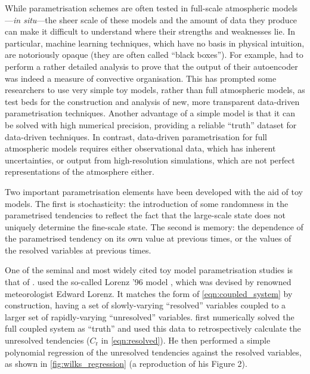 \documentclass[titlepage]{article}
\begin{document}
While parametrisation schemes are often tested in full-scale atmospheric
models---\emph{in situ}---the sheer scale of these models and the amount of
data they produce can make it difficult to understand where their strengths and
weaknesses lie. In particular, machine learning techniques, which have no basis
in physical intuition, are notoriously opaque (they are often called ``black
boxes''). For example, \textcite{shamekh2022} had to perform a rather detailed
analysis to prove that the output of their autoencoder was indeed a measure of
convective organisation. This has prompted some researchers to use very simple
toy models, rather than full atmospheric models, as test beds for the
construction and analysis of new, more transparent data-driven parametrisation
techniques. Another advantage of a simple model is that it can be solved with
high numerical precision, providing a reliable ``truth'' dataset for
data-driven techniques. In contrast, data-driven parametrisation for full
atmospheric models requires either observational data, which has inherent
uncertainties, or output from high-resolution simulations, which are not
perfect representations of the atmosphere either.

Two important parametrisation elements have been developed with the aid of toy
models. The first is stochasticity: the introduction of some randomness in the
parametrised tendencies to reflect the fact that the large-scale state does
not uniquely determine the fine-scale state. The second is memory: the dependence
of the parametrised tendency on its own value at previous times, or the values
of the resolved variables at previous times.

One of the seminal and most widely cited toy model parametrisation studies is
that of \textcite{wilks2005}. \citeauthor{wilks2005} used the so-called Lorenz
'96 model \parencite{lorenz1995}, which was devised by renowned meteorologist
Edward Lorenz. It matches the form of \autoref{eqn:coupled_system} by
construction, having a set of slowly-varying ``resolved'' variables coupled to
a larger set of rapidly-varying ``unresolved'' variables.
\citeauthor{wilks2005} first numerically solved the full coupled system as
``truth'' and used this data to retrospectively calculate the unresolved
tendencies ($C_\mathrm{r}$ in \autoref{eqn:resolved}). He then performed a
simple polynomial regression of the unresolved tendencies against the
resolved variables, as shown in \autoref{fig:wilks_regression} (a reproduction
of his Figure 2).
\end{document}
